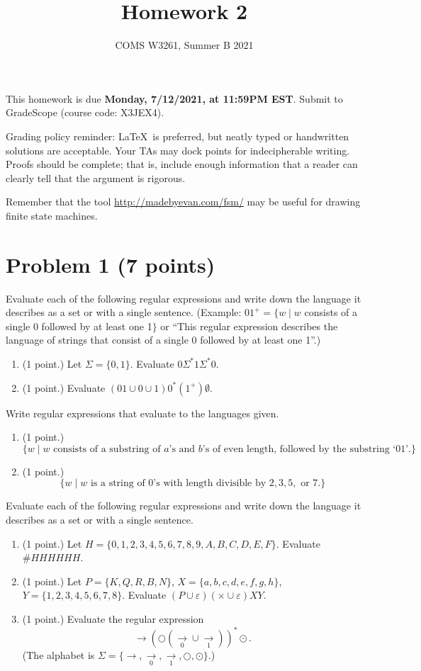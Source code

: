 \documentclass[letterpaper,11pt,twoside]{article}
\title{Homework 2}
\date{COMS W3261, Summer B 2021}
\theoremstyle{plain}
\theoremstyle{definition}
\theoremstyle{remark}
\theoremstyle{restate}
\begin{document}
\maketitle

This homework is due \textbf{Monday, 7/12/2021, at 11:59PM EST}. Submit to GradeScope (course code: X3JEX4).

Grading policy reminder: \LaTeX~is preferred, but neatly typed or handwritten solutions are acceptable. Your TAs may dock points for indecipherable writing. Proofs should be complete; that is, include enough information that a reader can clearly tell that the argument is rigorous.

Remember that the tool \url{http://madebyevan.com/fsm/} may be useful for drawing finite state machines.

\clearpage
\section{Problem 1 (7 points)}

Evaluate each of the following regular expressions and write down the language it describes as a set or with a single sentence. (Example: $01^+ = \{w \; | \; w $ consists of a single 0 followed by at least one 1$\}$ or ``This regular expression describes the language of strings that consist of a single 0 followed by at least one 1''.)

\begin{enumerate}
    \item (1 point.) Let $\Sigma = \{0,1\}$. Evaluate $0\Sigma^*1\Sigma^*0$.
    \item (1 point.) Evaluate $(01 \cup 0 \cup 1)0^*(1^+)\emptyset$.
\end{enumerate}

Write regular expressions that evaluate to the languages given.
\begin{enumerate}[resume]
    \item (1 point.)
    \[
        \{w \; | \; w \text{ consists of a substring of }a\text{'s and }b\text{'s of even length, followed by the substring `01'.}\}
    \]
    \item (1 point.) 
    \[
        \{ w \; | \; w \text{ is a string of 0's with length divisible by } 2, 3, 5, \text{ or } 7.\}
    \]
\end{enumerate}
Evaluate each of the following regular expressions and write down the language it describes as a set or with a single sentence.
\begin{enumerate}[resume]
    \item (1 point.) Let $H = \{0, 1, 2, 3, 4, 5, 6, 7, 8, 9, A, B, C, D, E, F\}$. Evaluate $\#HHHHHH$.
    \item (1 point.) Let $P = \{K, Q, R, B, N\}$, $X = \{a, b, c, d, e, f, g, h\}$, $Y = \{1, 2, 3, 4, 5, 6, 7, 8\}$. Evaluate $(P \cup \varepsilon)(\times \cup \varepsilon)XY$. 
    \item (1 point.) Evaluate the regular expression
    \[
        \rightarrow(\bigcirc(\underset{0}{\rightarrow} \cup \underset{1}{\rightarrow}))^*\odot.
    \]
    (The alphabet is $\Sigma = \{\rightarrow, \underset{0}{\rightarrow}, \underset{1}{\rightarrow}, \bigcirc, \odot\}$.)
\end{enumerate}
\end{document}
